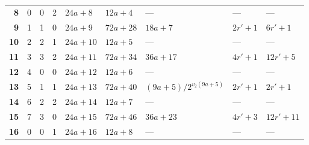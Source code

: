 \documentclass[11pt,a4paper]{article}
\theoremstyle{remark}
\theoremstyle{plain}
\begin{document}
\begin{tabular}{>{\bfseries}r|r|r|r|l|l|l|l|l}
\cellcolor{res8}  8  & \cellcolor{res0}0 & \cellcolor{res0}0 & \cellcolor{res2}2 & \cellcolor{res8}$24a + 8$   & \cellcolor{res8}$12a + 4$    & \cellcolor{res8}---                             & \cellcolor{res8}---           & \cellcolor{res8}--- \\
\cellcolor{res9}  9  & \cellcolor{res1}1 & \cellcolor{res1}1 & \cellcolor{res0}0 & \cellcolor{res9}$24a + 9$   & \cellcolor{res9}$72a + 28$   & \cellcolor{res9}$18a + 7$                      & \cellcolor{res9}$2r'+1$           & \cellcolor{res9}$6r'+1$ \\
\cellcolor{res10} 10 & \cellcolor{res2}2 & \cellcolor{res2}2 & \cellcolor{res1}1 & \cellcolor{res10}$24a + 10$ & \cellcolor{res10}$12a + 5$   & \cellcolor{res10}---                            & \cellcolor{res10}---          & \cellcolor{res10}--- \\
\cellcolor{res11} 11 & \cellcolor{res3}3 & \cellcolor{res3}3 & \cellcolor{res2}2 & \cellcolor{res11}$24a + 11$ & \cellcolor{res11}$72a + 34$  & \cellcolor{res11}$36a + 17$                    & \cellcolor{res11}$4r'+1$    & \cellcolor{res11}$12r'+5$ \\
\cellcolor{res12} 12 & \cellcolor{res4}4 & \cellcolor{res0}0 & \cellcolor{res0}0 & \cellcolor{res12}$24a + 12$ & \cellcolor{res12}$12a + 6$   & \cellcolor{res12}---                            & \cellcolor{res12}---          & \cellcolor{res12}--- \\
\cellcolor{res13} 13 & \cellcolor{res5}5 & \cellcolor{res1}1 & \cellcolor{res1}1 & \cellcolor{res13}$24a + 13$ & \cellcolor{res13}$72a + 40$  & \cellcolor{res13}$(9a + 5)/2^{v_2(9a+5)}$      & \cellcolor{res13}$2r'+1$          & \cellcolor{res13}$2r'+1$ \\
\cellcolor{res14} 14 & \cellcolor{res6}6 & \cellcolor{res2}2 & \cellcolor{res2}2 & \cellcolor{res14}$24a + 14$ & \cellcolor{res14}$12a + 7$   & \cellcolor{res14}---                            & \cellcolor{res14}---          & \cellcolor{res14}--- \\
\cellcolor{res15} 15 & \cellcolor{res7}7 & \cellcolor{res3}3 & \cellcolor{res0}0 & \cellcolor{res15}$24a + 15$ & \cellcolor{res15}$72a + 46$  & \cellcolor{res15}$36a + 23$                    & \cellcolor{res15}$4r'+3$    & \cellcolor{res15}$12r'+11$ \\
\cellcolor{res16} 16 & \cellcolor{res0}0 & \cellcolor{res0}0 & \cellcolor{res1}1 & \cellcolor{res16}$24a + 16$ & \cellcolor{res16}$12a + 8$   & \cellcolor{res16}---                            & \cellcolor{res16}---          & \cellcolor{res16}--- \\

\end{tabular}
\end{document}
